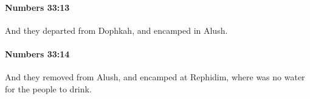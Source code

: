 		\paragraph{Numbers 33:13} %
			\label{NUMBERS-33-13}

			And they departed from Dophkah, and encamped in Alush.


		\paragraph{Numbers 33:14} %
			\label{NUMBERS-33-14}

			And they removed from Alush, and encamped at Rephidim, where was no water for the people to drink.


